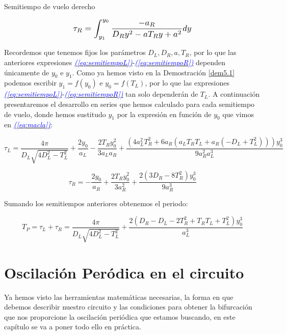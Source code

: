 \documentclass[12pt,a4paper]{report} %
\newcommand{\eref}[1]{\hyperref[#1]{\textcolor{blue}{\textit{(\ref*{#1})}}}}
\begin{document}
	\vspace{0.5cm}\noindent Semitiempo de vuelo derecho
	
	\begin{equation}
		\label{eq:semitiempoR}
		\scalebox{1.2}{$\displaystyle
		\tau_R=\int_{y_1}^{y_0}\frac{-a_R}{D_Ry^2-aT_Ry+a^2}dy
		$}
	\end{equation}\smallskip
	
	\vspace{0.5cm} Recordemos que tenemos fijos los parámetros $D_L,D_R,a,T_R$, por lo que las anteriores expresiones \eref{eq:semitiempoL}-\eref{eq:semitiempoR} dependen únicamente de $y_0$ e $y_1$. Como ya hemos visto en la Demostración \ref{dem5.1} podemos escribir $y_1=f(y_0)$ e $y_0=f(T_L)$, por lo que las expresiones \eref{eq:semitiempoL}-\eref{eq:semitiempoR} tan solo dependerán de $T_L$. A continuación presentaremos el desarrollo en series que hemos calculado para cada semitiempo de vuelo, donde hemos sustitudo $y_1$ por la expresión en función de $y_0$ que vimos en \eref{eq:macla}:
	
	\begin{equation}
		\label{eq:seriestL}
		\tau_L=\frac{4\pi}{D_L\sqrt{4D_L^2-T_L^2}}+\frac{2y_0}{a_L}-\frac{2T_Ry_0^2}{3a_La_R}+\frac{(4a_L^2T_R^2+6a_R(a_LT_RT_L+a_R(-D_L+T_L^2)))y_0^3}{9a_R^2a_L^3}
	\end{equation}\smallskip
	
	\vspace{0.5cm}
	
	\begin{equation}
		\label{eq:seriestR}
		\tau_R=-\frac{2y_0}{a_R}+\frac{2T_Ry_0^2}{3a_R^2}+\frac{2(3D_R-8T_R^2)y_0^3}{9a_R^3}
	\end{equation}\smallskip
	
	\vspace{0.5cm}\noindent Sumando los semitiempos anteriores obtenemos el periodo:
	
	\begin{equation}
		T_P=\tau_L + \tau_R = \frac{4\pi}{D_L\sqrt{4D_L^2-T_L^2}}+\frac{2(D_R-D_L-2T_R^2+T_RT_L+T_L^2)y_0^3}{a_L^3}
	\end{equation}
	
	\newpage
	
	\chapter{Oscilación Peródica en el circuito}
	
	Ya hemos visto las herramientas matemáticas necesarias, la forma en que debemos describir nuestro circuito y las condiciones para obtener la bifurcación que nos proporcione la oscilación periódica que estamos buscando, en este capítulo se va a poner todo ello en práctica.
	
\end{document}
